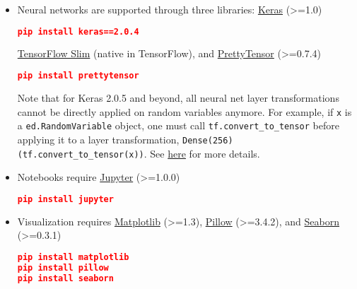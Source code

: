 \begin{itemize}
  \item Neural networks are supported through three libraries:
  \href{http://keras.io}{Keras} (>=1.0)
\begin{lstlisting}[language=JSON]
pip install keras==2.0.4
\end{lstlisting}
  \href{https://github.com/tensorflow/tensorflow/tree/master/tensorflow/contrib/slim}{TensorFlow Slim}
  (native in TensorFlow), and
  \href{https://github.com/google/prettytensor}{PrettyTensor} (>=0.7.4)
\begin{lstlisting}[language=JSON]
pip install prettytensor
\end{lstlisting}
Note that for Keras 2.0.5 and beyond, all neural net layer transformations cannot be directly applied on random variables anymore. For example, if \texttt{x} is a \texttt{ed.RandomVariable} object, one must call \texttt{tf.convert_to_tensor} before applying it to a layer transformation, \texttt{Dense(256)(tf.convert_to_tensor(x))}.
See \href{https://github.com/fchollet/keras/issues/6979}{here} for more details.
  \item Notebooks require
  \href{http://jupyter.org}{Jupyter} (>=1.0.0)
\begin{lstlisting}[language=JSON]
pip install jupyter
\end{lstlisting}
  \item Visualization requires
  \href{http://matplotlib.org}{Matplotlib} (>=1.3),
  \href{https://pillow.readthedocs.io}{Pillow} (>=3.4.2), and
  \href{https://seaborn.pydata.org}{Seaborn} (>=0.3.1)
\begin{lstlisting}[language=JSON]
pip install matplotlib
pip install pillow
pip install seaborn
\end{lstlisting}
\end{itemize}
